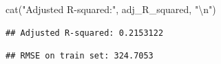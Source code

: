 \documentclass[
]{article}
\newenvironment{Shaded}{\begin{snugshade}}{\end{snugshade}}
\newcommand{\CommentTok}[1]{\textcolor[rgb]{0.56,0.35,0.01}{\textit{#1}}}
\newcommand{\DecValTok}[1]{\textcolor[rgb]{0.00,0.00,0.81}{#1}}
\newcommand{\FunctionTok}[1]{\textcolor[rgb]{0.00,0.00,0.00}{#1}}
\newcommand{\NormalTok}[1]{#1}
\newcommand{\OtherTok}[1]{\textcolor[rgb]{0.56,0.35,0.01}{#1}}
\newcommand{\SpecialCharTok}[1]{\textcolor[rgb]{0.00,0.00,0.00}{#1}}
\newcommand{\StringTok}[1]{\textcolor[rgb]{0.31,0.60,0.02}{#1}}
\begin{document}
\begin{Shaded}
\begin{Highlighting}[]
\FunctionTok{cat}\NormalTok{(}\StringTok{"Adjusted R{-}squared:"}\NormalTok{, adj\_R\_squared, }\StringTok{"}\SpecialCharTok{\textbackslash{}n}\StringTok{"}\NormalTok{)}
\end{Highlighting}
\end{Shaded}

\begin{verbatim}
## Adjusted R-squared: 0.2153122
\end{verbatim}

\begin{Shaded}
\end{Shaded}

\begin{verbatim}
## RMSE on train set: 324.7053
\end{verbatim}
\end{document}
